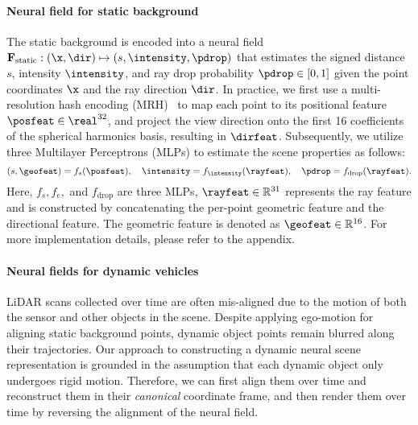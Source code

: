\paragraph{Neural field for static background} 
The static background is encoded into a neural field $\mathbf{F}_\text{static}: (\x, \dir) \mapsto (s, \intensity, \pdrop)$ that estimates the signed distance $s$, intensity $\intensity$, and ray drop probability $\pdrop \in [0,1]$ given the point coordinates $\x$ and the ray direction $\dir$. In practice, we first use a multi-resolution hash encoding (MRH)~\cite{mueller2022instant} to map each point to its positional feature $\posfeat \in \real^{32}$, and project the view direction onto the first 16 coefficients of the spherical harmonics basis, resulting in $\dirfeat$. Subsequently, we utilize three Multilayer Perceptrons (MLPs) to estimate the scene properties as follows:
\begin{equation}
(s, \geofeat) = f_s(\posfeat), \quad \intensity = f_{\intensity}(\rayfeat), \quad \pdrop = f_{\text{drop}}(\rayfeat).
\end{equation}
Here, $f_s, f_e,$ and $f_{\text{drop}}$ are three MLPs, $\rayfeat \in \mathbb{R}^{31}$ represents the ray feature and is constructed by concatenating the per-point geometric feature and the directional feature. The geometric feature is denoted as $\geofeat \in \mathbb{R}^{16}$. For more implementation details, please refer to the appendix. 




\paragraph{Neural fields for dynamic vehicles} 
LiDAR scans collected over time are often mis-aligned due to the motion of both the sensor and other objects in the scene. Despite applying ego-motion for aligning static background points, dynamic object points remain blurred along their trajectories. Our approach to constructing a dynamic neural scene representation is grounded in the assumption that each dynamic object only undergoes rigid motion. Therefore, we can first align them over time and reconstruct them in their \textit{canonical} coordinate frame, and then render them over time by reversing the alignment of the neural field.

